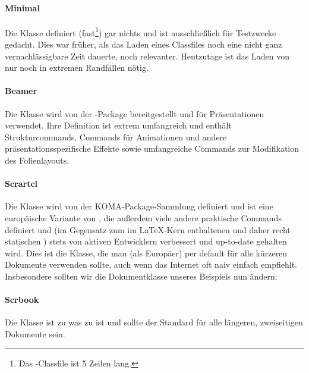\paragraph{Minimal}
Die Klasse  definiert (fast\footnote{Das -Classfile ist 5 Zeilen lang.}) gar nichts und ist ausschließlich für Testzwecke gedacht.
Dies war früher, als das Laden eines Classfiles noch eine nicht ganz vernachlässigbare Zeit dauerte, noch relevanter.
Heutzutage ist das Laden von  nur noch in extremen Randfällen nötig. 

\paragraph{Beamer}
Die Klasse  wird von der -Package bereitgestellt und für Präsentationen verwendet.
Ihre Definition ist extrem umfangreich und enthält Strukturcommands, Commands für Animationen und andere präsentationsspezifische Effekte sowie umfangreiche Commands zur Modifikation des Folienlayouts.

\paragraph{Scrartcl}
Die Klasse  wird von der KOMA-Package-Sammlung definiert und ist eine europäische Variante von , die außerdem viele andere praktische Commands definiert und (im Gegensatz zum im \LaTeX{}-Kern enthaltenen und daher recht statischen ) stets von aktiven Entwicklern verbessert und up-to-date gehalten wird.
Dies ist die Klasse, die man (als Europäer) per default für alle kürzeren Dokumente verwenden sollte, auch wenn das Internet oft naiv einfach  empfiehlt.
Insbesondere sollten wir die Dokumentklasse unseres Beispiels nun ändern:


\paragraph{Scrbook}
Die Klasse  ist zu  was  zu  ist und sollte der Standard für alle längeren, zweiseitigen Dokumente sein.



